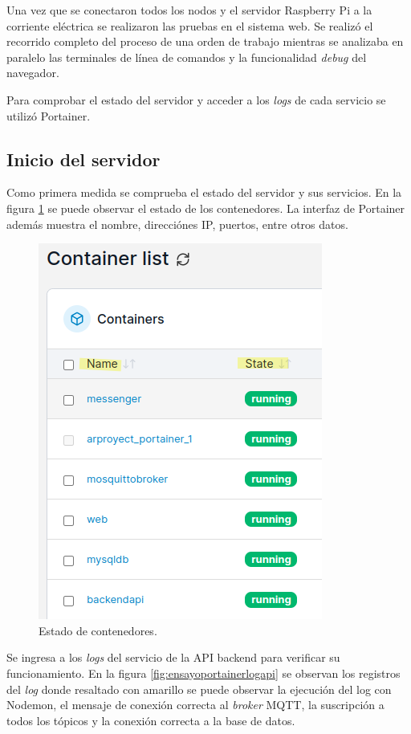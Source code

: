 Una vez que se conectaron todos los nodos y el servidor Raspberry Pi a la corriente eléctrica se realizaron las pruebas en el sistema web. Se realizó el recorrido completo del proceso de una orden de trabajo mientras se analizaba en paralelo las terminales de línea de comandos y la funcionalidad \textit{debug} del navegador.

Para comprobar el estado del servidor y acceder a los \textit{logs} de cada servicio se utilizó Portainer.

\subsection{Inicio del servidor}
\label{subsec:ensayoservidor}

Como primera medida se comprueba el estado del servidor y sus servicios. En la figura \ref{fig:ensayoportainer3} se puede observar el estado de los contenedores. La interfaz de Portainer además muestra el nombre, direcciónes IP, puertos, entre otros datos.

\begin{figure}[H]
	\centering
	\includegraphics[scale=.70]{./Figures/ensayo-1/3.portainer2.png}
	\caption{Estado de contenedores.}
	\label{fig:ensayoportainer3}
\end{figure}

Se ingresa a los \textit{logs} del servicio de la API backend para verificar su funcionamiento.  En la figura \ref{fig:ensayoportainerlogapi} se observan los registros del \textit{log} donde resaltado con amarillo se puede observar la ejecución del log con Nodemon, el mensaje de conexión correcta al \textit{broker} MQTT, la suscripción a todos los tópicos y la conexión correcta a la base de datos.

